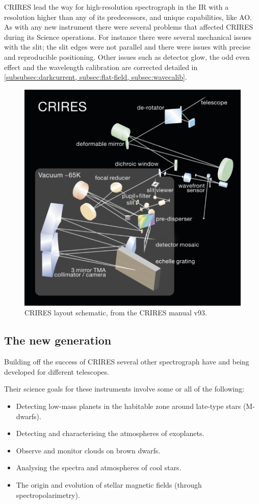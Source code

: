 CRIRES lead the way for high-resolution spectrograph in the IR with a resolution higher than any of its predecessors, and unique capabilities, like AO. As with any new instrument there were several problems that affected CRIRES during its Science operations. For instance there were several mechanical issues with the slit; the slit edges were not parallel and there were issues with precise and reproducible positioning. Other issues such as detector glow, the odd even effect and the wavelength calibration are corrected detailed in \cref{subsubsec:darkcurrent, subsec:flat-field, subsec:wavecalib}.


\begin{figure}
    \centering
    \includegraphics[width=0.7\linewidth]{figures/spectroscopy/CRIRES_schematic.pdf}
    \caption{CRIRES layout schematic, from the CRIRES manual v93.}
    \label{fig:criresschematic}
\end{figure}


\subsection{The new generation}
\label{subsec:new_generation}
Building off the success of CRIRES several other \nir{} spectrograph have and being developed for different telescopes.

Their science goals for these instruments involve some or all of the following:

\begin{itemize}
\item Detecting low-mass planets in the habitable zone around late-type stars (M-dwarfs).
\item Detecting and characterising the atmospheres of exoplanets.
\item Observe and monitor clouds on brown dwarfs.
\item Analysing the spectra and atmospheres of cool stars.
\item The origin and evolution of stellar magnetic fields (through spectropolarimetry).
\end{itemize}

